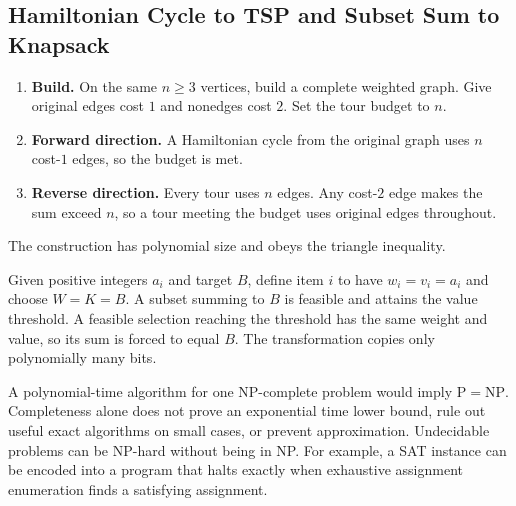 \documentclass[12pt,a4paper]{article}
\begin{document}
\subsection{Hamiltonian Cycle to TSP and Subset Sum to Knapsack}
\begin{tcolorbox}[examplebox, title={TSP with costs 1 and 2}]
\begin{enumerate}[leftmargin=*, itemsep=2pt]
  \item \textbf{Build.} On the same $n\ge3$ vertices, build a complete weighted graph. Give original edges cost $1$ and nonedges cost $2$. Set the tour budget to $n$.
  \item \textbf{Forward direction.} A Hamiltonian cycle from the original graph uses $n$ cost-$1$ edges, so the budget is met.
  \item \textbf{Reverse direction.} Every tour uses $n$ edges. Any cost-$2$ edge makes the sum exceed $n$, so a tour meeting the budget uses original edges throughout.
\end{enumerate}
The construction has polynomial size and obeys the triangle inequality.
\end{tcolorbox}

\begin{tcolorbox}[examplebox, title={Decision Knapsack from Subset Sum}]
Given positive integers $a_i$ and target $B$, define item $i$ to have $w_i=v_i=a_i$ and choose $W=K=B$. A subset summing to $B$ is feasible and attains the value threshold. A feasible selection reaching the threshold has the same weight and value, so its sum is forced to equal $B$. The transformation copies only polynomially many bits.
\end{tcolorbox}

\begin{tcolorbox}[masonbox, title={What completeness lets you conclude}]
A polynomial-time algorithm for one NP-complete problem would imply $\mathrm{P}=\mathrm{NP}$. Completeness alone does not prove an exponential time lower bound, rule out useful exact algorithms on small cases, or prevent approximation. Undecidable problems can be NP-hard without being in NP. For example, a SAT instance can be encoded into a program that halts exactly when exhaustive assignment enumeration finds a satisfying assignment.
\end{tcolorbox}
\end{document}
